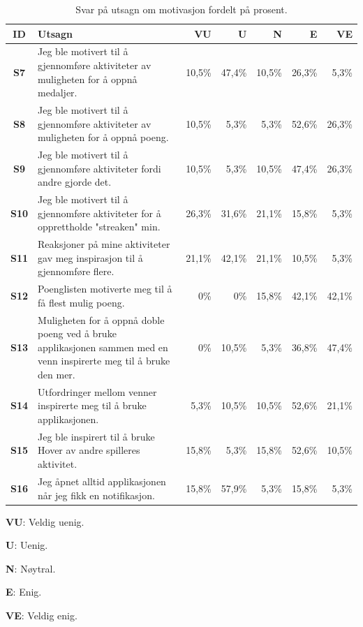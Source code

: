  \begin{table}[H]
    \small
    
    \begin{threeparttable}[t]
    \begin{tabularx}{\textwidth}{|>{\bfseries}c|X|r|r|r|r|r|}
        \hline  \textbf{ID} &  \textbf{Utsagn} & \textbf{VU }  &  \textbf{U}  &  \textbf{N}  &  \textbf{E}  &  \textbf{VE}  \\ \hline
        S7 & Jeg ble motivert til å gjennomføre aktiviteter av muligheten for å oppnå medaljer.  & 10,5\% & 47,4\% & 10,5\% & 26,3\% & 5,3\% \\ 
        S8 & Jeg ble motivert til å gjennomføre aktiviteter av muligheten for å oppnå poeng.  & 10,5\% & 5,3\% & 5,3\% & 52,6\% & 26,3\% \\ 
        S9 & Jeg ble motivert til å gjennomføre aktiviteter fordi andre gjorde det.  & 10,5\% & 5,3\% & 10,5\% & 47,4\% & 26,3\% \\ 
        S10 & Jeg ble motivert til å gjennomføre aktiviteter for å opprettholde "streaken" min.  & 26,3\% & 31,6\% & 21,1\% & 15,8\% & 5,3\% \\ 
        S11 & Reaksjoner på mine aktiviteter gav meg inspirasjon til å gjennomføre flere.  & 21,1\% & 42,1\% & 21,1\% & 10,5\% & 5,3\% \\ 
        S12 & Poenglisten motiverte meg til å få flest mulig poeng.  & 0\% & 0\% & 15,8\% & 42,1\% & 42,1\% \\ 
        S13 & Muligheten for å oppnå doble poeng ved å bruke applikasjonen sammen med en venn inspirerte meg til å bruke den mer.  & 0\% & 10,5\% & 5,3\% & 36,8\% & 47,4\% \\ 
        S14 & Utfordringer mellom venner inspirerte meg til å bruke applikasjonen.  & 5,3\% & 10,5\% & 10,5\% & 52,6\% & 21,1\% \\ 
        S15 & Jeg ble inspirert til å bruke Hover av andre spilleres aktivitet.  & 15,8\% & 5,3\% & 15,8\% & 52,6\% & 10,5\% \\ 
        S16 & Jeg åpnet alltid applikasjonen når jeg fikk en notifikasjon.  & 15,8\% & 57,9\% & 5,3\% & 15,8\% & 5,3\% \\
         \hline
    \end{tabularx}
    \begin{tablenotes}
    \scriptsize
     \item[] \textbf{VU}: Veldig uenig.
     \item[] \textbf{U}: Uenig.
     \item[] \textbf{N}: Nøytral.
     \item[] \textbf{E}: Enig.
     \item[] \textbf{VE}: Veldig enig.
   \end{tablenotes}
   \end{threeparttable}
   \caption{Svar på utsagn om motivasjon fordelt på prosent.}
\end{table}


